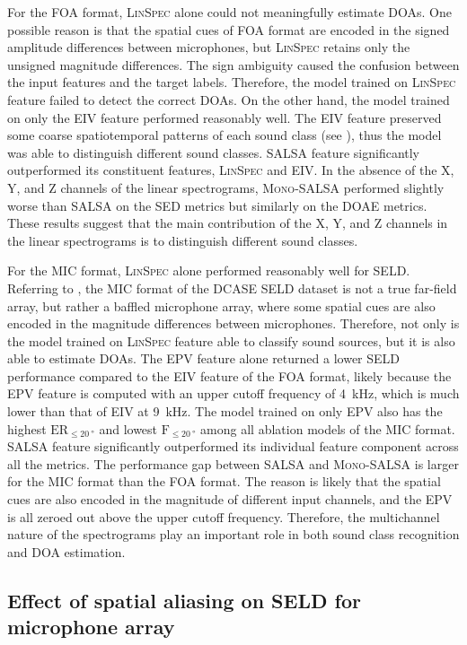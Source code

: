 \documentclass[journal]{IEEEtran}
\newcommand{\ER}{$\text{ER}_{\le \SI{20}{\degree}}$\xspace}
\newcommand{\Fone}{$\text{F}_{\le \SI{20}{\degree}}$\xspace}
\begin{document}
For the FOA format, \textsc{LinSpec} alone could not meaningfully estimate DOAs. One possible reason is that the spatial cues of FOA format are encoded in the signed amplitude differences between microphones, but \textsc{LinSpec} retains only the unsigned magnitude differences. 
The sign ambiguity caused the confusion between the input features and the target labels. Therefore, the model trained on \textsc{LinSpec} feature failed to detect the correct DOAs. On the other hand, the model trained on only the EIV feature performed reasonably well. The EIV feature preserved some coarse spatiotemporal patterns of each sound class (see ), thus the model was able to distinguish different sound classes. 
SALSA feature significantly outperformed its constituent features, \textsc{LinSpec} and EIV. In the absence of the X, Y, and Z channels of the linear spectrograms, \textsc{Mono-SALSA} performed slightly worse than SALSA on the SED metrics but similarly on the DOAE metrics. These results suggest that the main contribution of the X, Y, and Z channels in the linear spectrograms is to distinguish different sound classes. 

For the MIC format, \textsc{LinSpec} alone performed reasonably well for SELD. Referring to , the MIC format of the DCASE SELD dataset is not a true far-field array, but rather a baffled microphone array, where some spatial cues are also encoded in the magnitude differences between microphones. Therefore, not only is the model trained on \textsc{LinSpec} feature able to classify sound sources, but it is also able to estimate DOAs. The EPV feature alone returned a lower SELD performance compared to the EIV feature of the FOA format, likely because the EPV feature is computed with an upper cutoff frequency of \SI{4}{\kilo\hertz}, which is much lower than that of EIV at \SI{9}{\kilo\hertz}. 
The model trained on only EPV also has the highest \ER and lowest \Fone among all ablation models of the MIC format. SALSA feature significantly outperformed its individual feature component across all the metrics. The performance gap between SALSA and \textsc{Mono-SALSA} is larger for the MIC format than the FOA format. The reason is likely that the spatial cues are also encoded in the magnitude of different input channels, and the EPV is all zeroed out above the upper cutoff frequency. Therefore, the multichannel nature of the spectrograms play an important role in both sound class recognition and DOA estimation. 

\subsection{Effect of spatial aliasing on SELD for microphone array}
\end{document}
